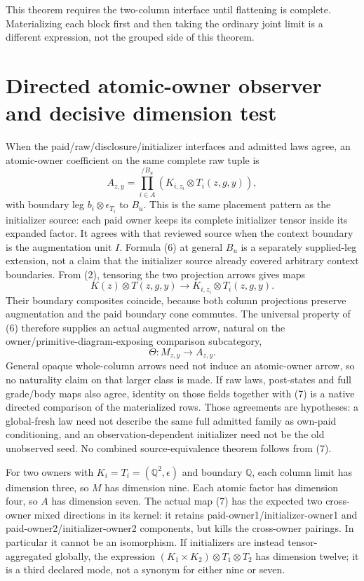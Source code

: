 \documentclass[11pt]{article}
\begin{document}
This theorem requires the two-column interface until flattening is complete. Materializing each block first and then taking the ordinary joint limit is a different expression, not the grouped side of this theorem.

\section{Directed atomic-owner observer and decisive dimension test}
When the paid/raw/disclosure/initializer interfaces and admitted laws agree, an atomic-owner coefficient on the same complete raw tuple is
\[
              A_{z,y}=\prod_{i\in A}^{/B_u}(K_{i,z_i}\otimes T_i(z,g,y)), \tag{6}
\]
with boundary leg $b_i\otimes\epsilon_{T_i}$ to $B_u$. This is the same placement pattern as the initializer source: each paid owner keeps its complete initializer tensor inside its expanded factor. It agrees with that reviewed source when the context boundary is the augmentation unit $I$. Formula (6) at general $B_u$ is a separately supplied-leg extension, not a claim that the initializer source already covered arbitrary context boundaries. From (2), tensoring the two projection arrows gives maps
\[
 K(z)\otimes T(z,g,y)\longrightarrow K_{i,z_i}\otimes T_i(z,g,y).
\]
Their boundary composites coincide, because both column projections preserve augmentation and the paid boundary cone commutes. The universal property of (6) therefore supplies an actual augmented arrow, natural on the owner/primitive-diagram-exposing comparison subcategory,
\[
                         \Theta:M_{z,y}\longrightarrow A_{z,y}. \tag{7}
\]
General opaque whole-column arrows need not induce an atomic-owner arrow, so no naturality claim on that larger class is made. If raw laws, post-states and full grade/body maps also agree, identity on those fields together with (7) is a native directed comparison of the materialized rows. Those agreements are hypotheses: a global-fresh law need not describe the same full admitted family as own-paid conditioning, and an observation-dependent initializer need not be the old unobserved seed. No combined source-equivalence theorem follows from (7).

For two owners with $K_i=T_i=(\mathbb Q^2,\epsilon)$ and boundary $\mathbb Q$, each column limit has dimension three, so $M$ has dimension nine. Each atomic factor has dimension four, so $A$ has dimension seven. The actual map (7) has the expected two cross-owner mixed directions in its kernel: it retains paid-owner1/initializer-owner1 and paid-owner2/initializer-owner2 components, but kills the cross-owner pairings. In particular it cannot be an isomorphism. If initializers are instead tensor-aggregated globally, the expression $(K_1\times K_2)\otimes T_1\otimes T_2$ has dimension twelve; it is a third declared mode, not a synonym for either nine or seven.
\end{document}
